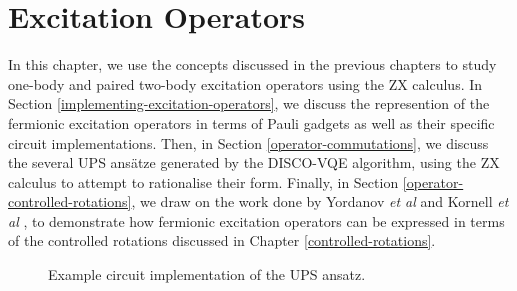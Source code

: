 \chapter{Excitation Operators}%
\label{excitation-operators}

In this chapter, we use the concepts discussed in the previous chapters to study one-body and paired two-body excitation operators using the ZX calculus. In Section \ref{implementing-excitation-operators}, we discuss the represention of the fermionic excitation operators in terms of Pauli gadgets as well as their specific circuit implementations. Then, in Section \ref{operator-commutations}, we discuss the several UPS ansätze generated by the DISCO-VQE algorithm, using the ZX calculus to attempt to rationalise their form. Finally, in Section \ref{operator-controlled-rotations}, we draw on the work done by Yordanov \textit{et al} \cite{Yordanov2020} and Kornell \textit{et al} \cite{Kornell2023}, to demonstrate how fermionic excitation operators can be expressed in terms of the controlled rotations discussed in Chapter \ref{controlled-rotations}.

\begin{figure}[H]
    \centering
    \caption{Example circuit implementation of the UPS ansatz.}
\end{figure}


